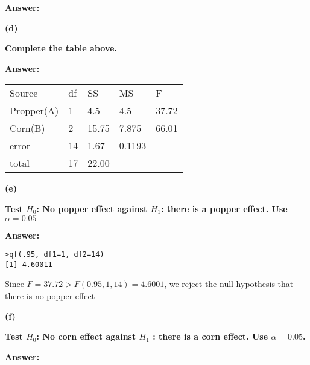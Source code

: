 \documentclass[letterpaper,11pt]{article}
\begin{document}
  \begin{addmargin}[-0.5em]{0em}
  \textbf{Answer: }\end{addmargin}

  \bigbreak
  \begin{addmargin}[-1.1em]{0em}
  \textbf{(d)}\par\end{addmargin}
    \textbf{Complete the table above.}\par
  \bigbreak
  \begin{addmargin}[-0.5em]{0em}
  \textbf{Answer: }\end{addmargin}

  \begin{center}
  \begin{tabular}{ p{5cm}p{1cm}p{1.5cm}p{1.5cm}p{1.5cm}}
  \centering Source & df & SS & MS & F\\
  \centering Propper(A) & 1 & 4.5 & 4.5 & 37.72\\
  \centering Corn(B) & 2 & 15.75 & 7.875 & 66.01\\
  \centering error & 14 & 1.67 & 0.1193 & {}\\
  \centering total & 17 & 22.00 & {} & {}\\
  \end{tabular}
  \end{center}

  \bigbreak
  \begin{addmargin}[-1.1em]{0em}
  \textbf{(e)}\par\end{addmargin}
    \textbf{Test $H_0$: No popper effect against $H_1$: there is a popper effect. Use $\alpha = 0.05$}\par
  \bigbreak
  \begin{addmargin}[-0.5em]{0em}
  \textbf{Answer: }\end{addmargin}

\begin{lstlisting}
>qf(.95, df1=1, df2=14)
[1] 4.60011
\end{lstlisting}
Since $F = 37.72 > F(0.95,1,14) = 4.6001$, we reject the null hypothesis that there is no popper effect


    \bigbreak
    \begin{addmargin}[-1.1em]{0em}
    \textbf{(f)}\par\end{addmargin}
      \textbf{Test $H_0$: No corn effect against $H_1$ : there is a corn effect. Use $\alpha = 0.05$.
}\par
    \bigbreak
    \begin{addmargin}[-0.5em]{0em}
    \textbf{Answer: }\end{addmargin}
\end{document}
